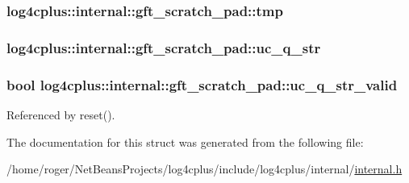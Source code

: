 \hypertarget{structlog4cplus_1_1internal_1_1gft__scratch__pad_a905a270c2e951498e63f2f0407f85dd1}{
\subsubsection[{tmp}]{ log4cplus\-::internal\-::gft\-\_\-scratch\-\_\-pad\-::tmp}}\label{structlog4cplus_1_1internal_1_1gft__scratch__pad_a905a270c2e951498e63f2f0407f85dd1}
\hypertarget{structlog4cplus_1_1internal_1_1gft__scratch__pad_aba1b65172a1b761ef4409d31e288551d}{
\subsubsection[{uc\-\_\-q\-\_\-str}]{ log4cplus\-::internal\-::gft\-\_\-scratch\-\_\-pad\-::uc\-\_\-q\-\_\-str}}\label{structlog4cplus_1_1internal_1_1gft__scratch__pad_aba1b65172a1b761ef4409d31e288551d}
\hypertarget{structlog4cplus_1_1internal_1_1gft__scratch__pad_a45949c161ba534fc0e7a24fa400d764c}{
\subsubsection[{uc\-\_\-q\-\_\-str\-\_\-valid}]{\setlength{\rightskip}{0pt plus 5cm}bool log4cplus\-::internal\-::gft\-\_\-scratch\-\_\-pad\-::uc\-\_\-q\-\_\-str\-\_\-valid}}\label{structlog4cplus_1_1internal_1_1gft__scratch__pad_a45949c161ba534fc0e7a24fa400d764c}


Referenced by reset().



The documentation for this struct was generated from the following file\-:\begin{DoxyCompactItemize}
\item 
/home/roger/\-Net\-Beans\-Projects/log4cplus/include/log4cplus/internal/\hyperlink{internal_8h}{internal.\-h}\end{DoxyCompactItemize}
